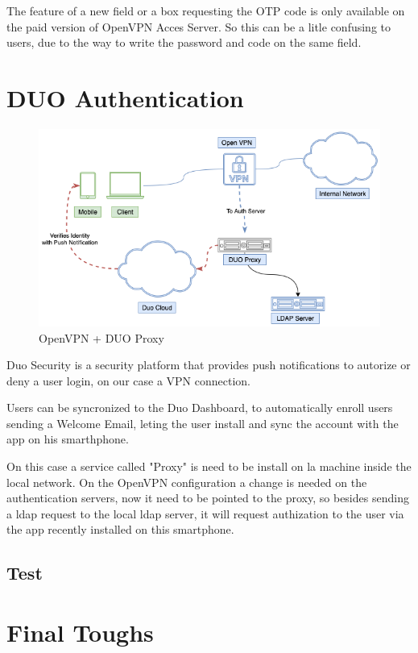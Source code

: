 The feature of a new field or a box requesting the OTP code is only available on the paid version of OpenVPN Acces Server.
So this can be a litle confusing to users, due to the way to write the password and code on the same field.




\newpage
\section{DUO Authentication}

\begin{figure}[!h]
  \centering
  \includegraphics[width=160mm]{images/DUO-Proxy.drawio.png}
  \caption{OpenVPN + DUO Proxy}
  \label{fig:label}
\end{figure}

Duo Security is a security platform that provides push notifications to autorize or deny a user login, on our case a VPN connection.

Users can be syncronized to the Duo Dashboard, to automatically enroll users sending a Welcome Email, leting the user install and sync the account with the app on his smarthphone.

On this case a service called "Proxy" is need to be install on la machine inside the local network. On the OpenVPN configuration a change is needed on the authentication servers, now it need to be pointed to the proxy, so besides sending a ldap request to the local ldap server, it will request authization to the user via the app recently installed on this smartphone.



\subsection{Test}


\newpage
\section{Final Toughs}
